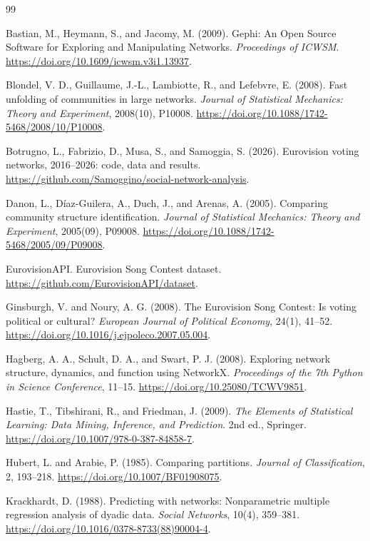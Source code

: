\documentclass[12pt,a4paper]{article}
\begin{document}
\FloatBarrier
\begin{thebibliography}{99}
\raggedright %
\setlength{\itemsep}{2pt}
\setlength{\parsep}{0pt}

Bastian, M., Heymann, S., and Jacomy, M. (2009).
Gephi: An Open Source Software for Exploring and
Manipulating Networks.
\textit{Proceedings of ICWSM}.
\url{https://doi.org/10.1609/icwsm.v3i1.13937}.

Blondel, V. D., Guillaume, J.-L.,
Lambiotte, R., and Lefebvre, E. (2008).
Fast unfolding of communities in large networks.
\textit{Journal of Statistical Mechanics:
Theory and Experiment}, 2008(10), P10008.
\url{https://doi.org/10.1088/1742-5468/2008/10/P10008}.

Botrugno, L., Fabrizio, D., Musa, S., and Samoggia, S. (2026).
Eurovision voting networks, 2016--2026: code, data and results.
\url{https://github.com/Samoggino/social-network-analysis}.

Danon, L., D\'iaz-Guilera, A.,
Duch, J., and Arenas, A. (2005).
Comparing community structure identification.
\textit{Journal of Statistical Mechanics:
Theory and Experiment}, 2005(09), P09008.
\url{https://doi.org/10.1088/1742-5468/2005/09/P09008}.

EurovisionAPI. Eurovision Song Contest dataset.
\url{https://github.com/EurovisionAPI/dataset}.

Ginsburgh, V. and Noury, A. G. (2008).
The Eurovision Song Contest:
Is voting political or cultural?
\textit{European Journal of Political Economy},
24(1), 41--52.
\url{https://doi.org/10.1016/j.ejpoleco.2007.05.004}.

Hagberg, A. A., Schult, D. A.,
and Swart, P. J. (2008).
Exploring network structure, dynamics,
and function using NetworkX.
\textit{Proceedings of the 7th Python
in Science Conference}, 11--15.
\url{https://doi.org/10.25080/TCWV9851}.

Hastie, T., Tibshirani, R.,
and Friedman, J. (2009).
\textit{The Elements of Statistical Learning:
Data Mining, Inference, and Prediction}.
2nd ed., Springer.
\url{https://doi.org/10.1007/978-0-387-84858-7}.

Hubert, L. and Arabie, P. (1985).
Comparing partitions.
\textit{Journal of Classification}, 2, 193--218.
\url{https://doi.org/10.1007/BF01908075}.

Krackhardt, D. (1988).
Predicting with networks:
Nonparametric multiple regression
analysis of dyadic data.
\textit{Social Networks}, 10(4), 359--381.
\url{https://doi.org/10.1016/0378-8733(88)90004-4}.


\end{thebibliography}
\end{document}
